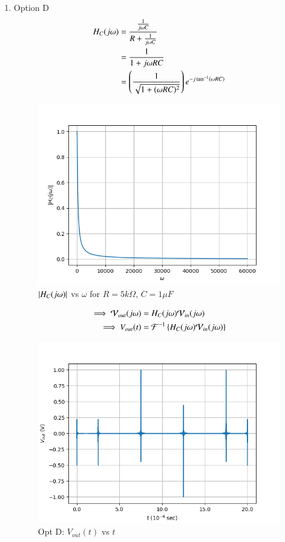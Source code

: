 \documentclass[journal,12pt,twocolumn]{IEEEtran}
\theoremstyle{remark}
\begin{document}
\begin{enumerate}
    \item Option D
    \begin{align}
        H_C(j\omega) &=  \frac{\frac{1}{j\omega C}}{R + \frac{1}{j\omega C}}\\
        &= \frac{1}{1+j\omega RC}\\
        &= \left(\frac{1}{\sqrt{1 + (\omega R C)^2}}\right)e^{-j\tan^{-1}\left(\omega RC\right)}
    \end{align}
    \begin{figure}[!h]
        \centering
        \includegraphics[width=\columnwidth]{figs/opt_d_hf.png}
        \caption{$\left\vert H_C(j\omega)\right\vert$ vs $\omega$ for $R=5k\Omega$, $C=1\mu F$}
        \label{fig:opt_d_hf_gate.ph.23.37}
    \end{figure}
    \begin{align}
        \implies \mathcal{V}_{out}(j\omega) &= H_C(j\omega)\mathcal{V}_{in}(j\omega)\\
        \implies V_{out}(t) &= \mathcal{F}^{-1}\left\{H_C(j\omega)\mathcal{V}_{in}(j\omega)\right\}
    \end{align}
    \begin{figure}[!h]
        \centering
        \includegraphics[width = \columnwidth]{figs/opt_d_res.png}
        \caption{Opt D: $V_{out}(t)$ vs $t$}
        \label{fig:opt_d_res_gate.23.ph.37}
    \end{figure}
\end{enumerate}
\end{document}
